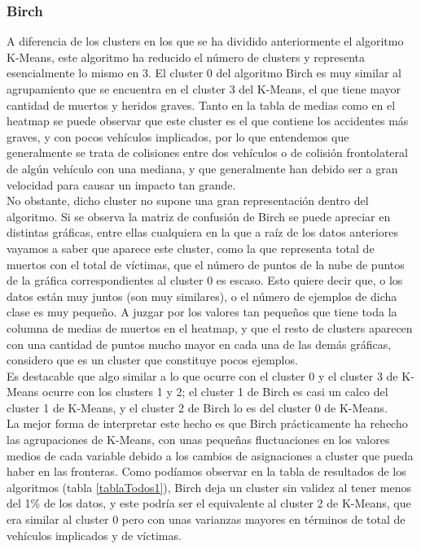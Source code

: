 	\subsubsection{Birch}
	A diferencia de los clusters en los que se ha dividido anteriormente el algoritmo K-Means, este algoritmo ha reducido el número de clusters y representa esencialmente lo mismo en 3. El cluster 0 del algoritmo Birch es muy similar al agrupamiento que se encuentra en el cluster 3 del K-Means, el que tiene mayor cantidad de muertos y heridos graves. Tanto en la tabla de medias como en el heatmap se puede observar que este cluster es el que contiene los accidentes más graves, y con pocos vehículos implicados, por lo que entendemos que generalmente se trata de colisiones entre dos vehículos o de colisión frontolateral de algún vehículo con una mediana, y que generalmente han debido ser a gran velocidad para causar un impacto tan grande.\\
	
	No obstante, dicho cluster no supone una gran representación dentro del algoritmo. Si se observa la matriz de confusión de Birch se puede apreciar en distintas gráficas, entre ellas cualquiera en la que a raíz de los datos anteriores vayamos a saber que aparece este cluster, como la que representa total de muertos con el total de víctimas, que el número de puntos de la nube de puntos de la gráfica correspondientes al cluster 0 es escaso. Esto quiere decir que, o los datos están muy juntos (son muy similares), o el número de ejemplos de dicha clase es muy pequeño. A juzgar por los valores tan pequeños que tiene toda la columna de medias de muertos en el heatmap, y que el resto de clusters aparecen con una cantidad de puntos mucho mayor en cada una de las demás gráficas, considero que es un cluster que constituye pocos ejemplos.\\
	
	Es destacable que algo similar a lo que ocurre con el cluster 0 y el cluster 3 de K-Means ocurre con los clusters 1 y 2; el cluster 1 de Birch es casi un calco del cluster 1 de K-Means, y el cluster 2 de Birch lo es del cluster 0 de K-Means.\\
	
	La mejor forma de interpretar este hecho es que Birch prácticamente ha rehecho las agrupaciones de K-Means, con unas pequeñas fluctuaciones en los valores medios de cada variable debido a los cambios de asignaciones a cluster que pueda haber en las fronteras. Como podíamos observar en la tabla de resultados de los algoritmos (tabla \ref{tablaTodos1}), Birch deja un cluster sin validez al tener menos del 1\% de los datos, y este podría ser el equivalente al cluster 2 de K-Means, que era similar al cluster 0 pero con unas varianzas mayores en términos de total de vehículos implicados y de víctimas.\\
	
